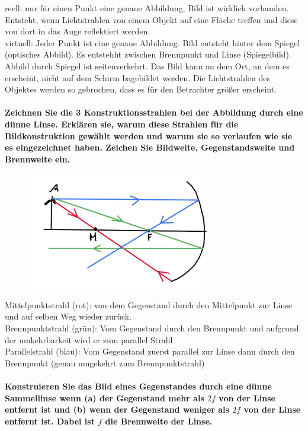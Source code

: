 \documentclass[a4paper, 11pt, ngerman, parskip=half]{scrartcl}
\begin{document}
reell: nur für einen Punkt eine genaue Abbildung, Bild ist wirklich vorhanden. Entsteht, wenn Lichtstrahlen von einem Objekt auf eine Fläche treffen und diese von dort in das Auge reflektiert werden.\\
virtuell: Jeder Punkt ist eine genaue Abbildung. Bild entsteht hinter dem Spiegel (optisches Abbild). Es entstehht zwischen Brennpunkt und Linse (Spiegelbild).  Abbild durch Spiegel ist seitenverkehrt.  Das Bild kann an dem Ort, an dem es erscheint, nicht auf dem Schirm bagebildet werden. Die Lichtstrahlen des Objektes werden so gebrochen, dass es für den Betrachter größer erscheint.

\paragraph{Zeichnen Sie die 3 Konstruktionsstrahlen bei der Abbildung durch eine dünne Linse.
Erklären sie, warum diese Strahlen für die Bildkonstruktion gewählt werden und warum sie so
verlaufen wie sie es eingezeichnet haben. Zeichen Sie Bildweite, Gegenstandsweite und Brennweite
ein.}

\begin{figure}[H]
    \centering
    \includegraphics[width=8cm]{image/17/geo14}
\end{figure}



Mittelpunktstrahl (rot): von dem Gegenstand durch den Mittelpunkt zur Linse und auf selben Weg wieder zurück.\\
Brennpunktstrahl (grün): Vom Gegenstand durch den Brennpunkt und aufgrund der umkehrbarkeit wird er zum parallel Strahl\\
Parallelstrahl (blau): Vom Gegenstand zuerst parallel zur Linse dann durch den Brennpunkt (genau umgekehrt zum Brennpunktstrahl)

\paragraph{Konstruieren Sie das Bild eines Gegenstandes durch eine dünne Sammellinse wenn (a) der
Gegenstand mehr als $2f$ von der Linse entfernt ist und (b) wenn der Gegenstand weniger als $2f$ von
der Linse entfernt ist. Dabei ist $f$ die Brennweite der Linse.}
\end{document}
